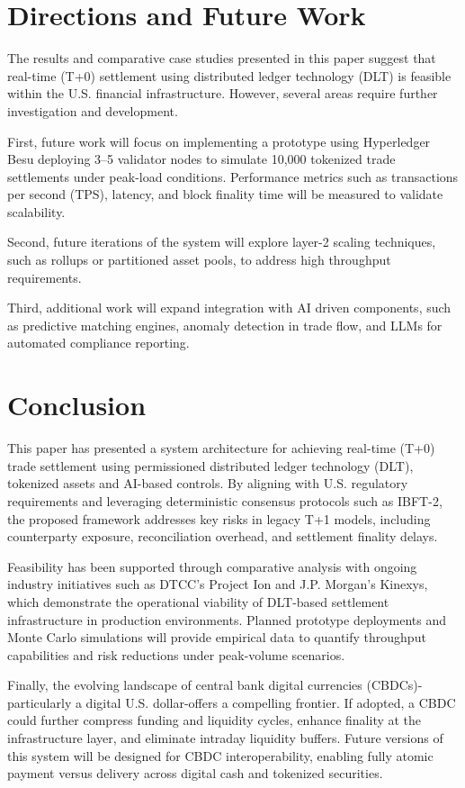 \documentclass[conference]{IEEEtran}
\begin{document}
\section{Directions and Future Work}
The results and comparative case studies presented in this paper suggest that real-time (T+0) settlement using distributed ledger technology (DLT) is feasible within the U.S. financial infrastructure. However, several areas require further investigation and development. 


First, future work will focus on implementing a prototype using Hyperledger Besu deploying 3–5 validator nodes to simulate 10,000 tokenized trade settlements under peak-load conditions. Performance metrics such as transactions per second (TPS), latency, and block finality time
will be measured to validate scalability. 

Second, future iterations of the system will explore layer-2 scaling techniques, such as rollups or partitioned asset pools, to address high throughput requirements.

Third, additional work will expand integration with AI driven components, such as predictive matching engines, anomaly detection in trade flow, and LLMs for automated compliance reporting.
\section{Conclusion}
This paper has presented a system architecture for achieving real-time (T+0) trade settlement using permissioned distributed ledger technology (DLT), tokenized assets and AI-based controls. By aligning with U.S. regulatory requirements and leveraging deterministic consensus protocols such as IBFT-2, the proposed framework addresses key risks in legacy T+1 models, including counterparty exposure, reconciliation overhead, and settlement finality delays.

Feasibility has been supported through comparative analysis with ongoing industry initiatives such as DTCC's Project Ion and J.P. Morgan’s Kinexys, which demonstrate the operational viability of DLT-based settlement infrastructure in production environments. Planned prototype deployments and Monte Carlo simulations will provide empirical data to quantify throughput capabilities and risk reductions under peak-volume scenarios.

Finally, the evolving landscape of central bank digital currencies (CBDCs)-particularly a digital U.S. dollar-offers a compelling frontier. If adopted, a CBDC could further compress funding and liquidity cycles, enhance finality at the infrastructure layer, and eliminate intraday liquidity buffers. Future versions of this system will be designed for CBDC interoperability, enabling fully atomic payment versus delivery across digital cash and tokenized securities.
\end{document}
